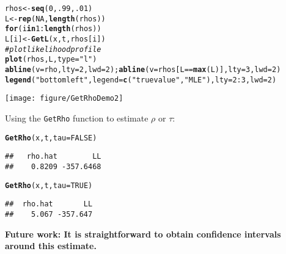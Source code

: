 \documentclass[10pt]{article}\usepackage[]{graphicx}\usepackage[]{color}
\makeatletter
\newcommand{\hlnum}[1]{\textcolor[rgb]{0.686,0.059,0.569}{#1}}%
\newcommand{\hlstr}[1]{\textcolor[rgb]{0.192,0.494,0.8}{#1}}%
\newcommand{\hlcom}[1]{\textcolor[rgb]{0.678,0.584,0.686}{\textit{#1}}}%
\newcommand{\hlopt}[1]{\textcolor[rgb]{0,0,0}{#1}}%
\newcommand{\hlstd}[1]{\textcolor[rgb]{0.345,0.345,0.345}{#1}}%
\newcommand{\hlkwa}[1]{\textcolor[rgb]{0.161,0.373,0.58}{\textbf{#1}}}%
\newcommand{\hlkwb}[1]{\textcolor[rgb]{0.69,0.353,0.396}{#1}}%
\newcommand{\hlkwc}[1]{\textcolor[rgb]{0.333,0.667,0.333}{#1}}%
\newcommand{\hlkwd}[1]{\textcolor[rgb]{0.737,0.353,0.396}{\textbf{#1}}}%
\newenvironment{kframe}{%
 \def\at@end@of@kframe{}%
 \ifinner\ifhmode%
  \def\at@end@of@kframe{\end{minipage}}%
  \begin{minipage}{\columnwidth}%
 \fi\fi%
 \def\FrameCommand##1{\hskip\@totalleftmargin \hskip-\fboxsep
 \colorbox{shadecolor}{##1}\hskip-\fboxsep
     \hskip-\linewidth \hskip-\@totalleftmargin \hskip\columnwidth}%
 \MakeFramed {\advance\hsize-\width
   \@totalleftmargin\z@ \linewidth\hsize
   \@setminipage}}%
 {\par\unskip\endMakeFramed%
 \at@end@of@kframe}
\newenvironment{knitrout}{}{} %
\makeatother
\begin{document}
\begin{knitrout}
\color{fgcolor}\begin{kframe}
\begin{alltt}
\hlstd{rhos} \hlkwb{<-} \hlkwd{seq}\hlstd{(}\hlnum{0}\hlstd{,}\hlnum{.99}\hlstd{,}\hlnum{.01}\hlstd{)}
\hlstd{L} \hlkwb{<-} \hlkwd{rep}\hlstd{(}\hlnum{NA}\hlstd{,} \hlkwd{length}\hlstd{(rhos))}
\hlkwa{for}\hlstd{(i} \hlkwa{in} \hlnum{1}\hlopt{:}\hlkwd{length}\hlstd{(rhos))}
  \hlstd{L[i]} \hlkwb{<-} \hlkwd{GetL}\hlstd{(x,t,rhos[i])}
\hlcom{# plot likelihood profile}
\hlkwd{plot}\hlstd{(rhos, L,} \hlkwc{type}\hlstd{=}\hlstr{"l"}\hlstd{)}
\hlkwd{abline}\hlstd{(}\hlkwc{v} \hlstd{= rho,} \hlkwc{lty}\hlstd{=}\hlnum{2}\hlstd{,} \hlkwc{lwd}\hlstd{=}\hlnum{2}\hlstd{);} \hlkwd{abline}\hlstd{(}\hlkwc{v} \hlstd{= rhos[L} \hlopt{==} \hlkwd{max}\hlstd{(L)],} \hlkwc{lty}\hlstd{=}\hlnum{3}\hlstd{,} \hlkwc{lwd}\hlstd{=}\hlnum{2}\hlstd{)}
\hlkwd{legend}\hlstd{(}\hlstr{"bottomleft"}\hlstd{,} \hlkwc{legend}\hlstd{=}\hlkwd{c}\hlstd{(}\hlstr{"true value"}\hlstd{,}\hlstr{"MLE"}\hlstd{),} \hlkwc{lty}\hlstd{=}\hlnum{2}\hlopt{:}\hlnum{3}\hlstd{,} \hlkwc{lwd}\hlstd{=}\hlnum{2}\hlstd{)}
\end{alltt}
\end{kframe}
\texttt{[image: figure/GetRhoDemo2]} 

\end{knitrout}


Using the \texttt{GetRho} function to estimate $\rho$ or $\tau$:
\begin{knitrout}
\color{fgcolor}\begin{kframe}
\begin{alltt}
\hlkwd{GetRho}\hlstd{(x, t,} \hlkwc{tau} \hlstd{=} \hlnum{FALSE}\hlstd{)}
\end{alltt}
\begin{verbatim}
##   rho.hat        LL 
##    0.8209 -357.6468
\end{verbatim}
\begin{alltt}
\hlkwd{GetRho}\hlstd{(x, t,} \hlkwc{tau} \hlstd{=} \hlnum{TRUE}\hlstd{)}
\end{alltt}
\begin{verbatim}
##  rho.hat       LL 
##    5.067 -357.647
\end{verbatim}
\end{kframe}
\end{knitrout}

{\bf Future work:  It is straightforward to obtain confidence intervals around this estimate.}
\end{document}

